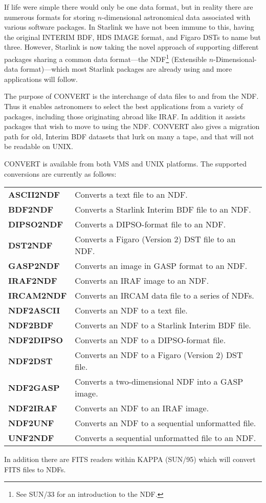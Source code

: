 If life were simple there would only be one data format, but in reality
there are numerous formats for storing $n$-dimensional astronomical data
associated with various software packages.   In Starlink we have not
been immune to this, having the original INTERIM BDF, HDS IMAGE format,
and Figaro DSTs to name but three.  However, Starlink is now taking the
novel approach of supporting different packages sharing a common data
format---the NDF\footnote{See SUN/33 for an introduction to the NDF.}
(Extensible $n$-Dimensional-data format)---which most Starlink packages
are already using and more applications will follow. 

The purpose of {\footnotesize CONVERT} is the interchange of data files
to and from the NDF.  Thus it enables astronomers to select the best
applications from a variety of packages, including those originating
abroad like IRAF. In addition it assists packages that wish to move to
using the NDF.  {\footnotesize CONVERT} also gives a migration path for
old, Interim BDF datasets that lurk on many a tape, and that will not be
readable on UNIX. 

{\footnotesize CONVERT} is available from both VMS and UNIX platforms.
The supported conversions are currently as follows: 

\begin{center}
\begin{tabular}{l@{ -- }l}
\medskip
{\bf ASCII2NDF} &  Converts a text file to an NDF. \\ \medskip
{\bf BDF2NDF} &  Converts a Starlink Interim BDF file to an NDF. \\ \medskip
{\bf DIPSO2NDF} & Converts a DIPSO-format file to an NDF. \\ \medskip
{\bf DST2NDF} &  Converts a Figaro (Version 2) DST file to an NDF. \\ \medskip
{\bf GASP2NDF} &  Converts an image in GASP format to an NDF. \\ \medskip
{\bf IRAF2NDF} &  Converts an IRAF image to an NDF. \\ \medskip
{\bf IRCAM2NDF} &  Converts an IRCAM data file to a series of NDFs. \\ \medskip
{\bf NDF2ASCII} &  Converts an NDF to a text file. \\ \medskip
{\bf NDF2BDF} &  Converts an NDF to a Starlink Interim BDF file. \\ \medskip
{\bf NDF2DIPSO} &  Converts an NDF to a DIPSO-format file. \\ \medskip
{\bf NDF2DST} & Converts an NDF to a Figaro (Version 2) DST file. \\ \medskip
{\bf NDF2GASP} & Converts a two-dimensional NDF into a GASP image. \\ \medskip
{\bf NDF2IRAF} & Converts an NDF to an IRAF image. \\ \medskip
{\bf NDF2UNF} &  Converts an NDF to a sequential unformatted file. \\ \medskip
{\bf UNF2NDF} &  Converts a sequential unformatted file to an NDF. \\
\end{tabular}
\end{center}
In addition there are FITS readers within {\footnotesize KAPPA} (SUN/95)
which will convert FITS files to NDFs.

